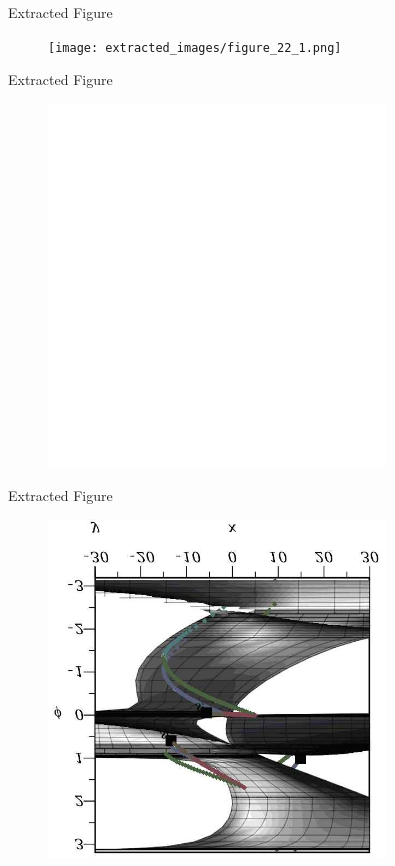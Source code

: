 \documentclass{beamer}
\begin{document}
\begin{frame}{Extracted Figure}
    \centering
    \begin{figure}
        \texttt{[image: extracted\_images/figure\_22\_1.png]}  %
    \end{figure}
\end{frame}

\begin{frame}{Extracted Figure}
    \centering
    \begin{figure}
        \includegraphics[width=0.8\textwidth]{extracted_images/figure_24_1.png}  %
    \end{figure}
\end{frame}

\begin{frame}{Extracted Figure}
    \centering
    \begin{figure}
        \includegraphics[width=0.8\textwidth]{extracted_images/figure_26_1.png}  %
    \end{figure}
\end{frame}
\end{document}
